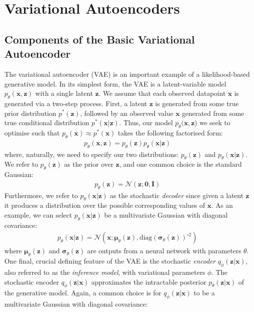 \documentclass[ oneside,%
                    author={George Herbert},
                    degree={MSci},
                     title={Diffusion Models for Time-Evolving Precipitation Fields},
                  subtitle={}]{dissertation}
\begin{document}
\section{Variational Autoencoders}
\label{sec:background_vae}

\subsection{Components of the Basic Variational Autoencoder}
\label{sec:background_vae_latent}

The variational autoencoder (VAE) \cite{Autoencoding_Variational_Bayes_Kingma,Stochastic_Backpropagation_Rezende} is an important example of a likelihood-based generative model. In its simplest form, the VAE is a latent-variable model $p_\theta(\mathbf{x},\mathbf{z})$ with a single latent $\mathbf{z}$. We assume that each observed datapoint $\mathbf{x}$ is generated via a two-step process. First, a latent $\mathbf{z}$ is generated from some true prior distribution $p^*(\mathbf{z})$, followed by an observed value $\mathbf{x}$ generated from some true conditional distribution $p^*(\mathbf{x}|\mathbf{z})$. Thus, our model $p_\theta(\mathbf{x},\mathbf{z}$) we seek to optimise such that $p_\theta(\mathbf{x})\approx p^*(\mathbf{x})$ takes the following factorised form:
\begin{align}
      p_\theta(\mathbf{x},\mathbf{z})=p_\theta(\mathbf{z})p_\theta(\mathbf{x}|\mathbf{z})
\end{align}
where, naturally, we need to specify our two distributions: $p_\theta(\mathbf{z})$ and $p_\theta(\mathbf{x}|\mathbf{z})$. We refer to $p_\theta(\mathbf{z})$ as the prior over $\mathbf{z}$, and one common choice is the standard Gaussian:
\begin{align}
      p_\theta(\mathbf{z})=\mathcal{N}(\mathbf{z};\mathbf{0}, \mathbf{I})
\end{align}
Furthermore, we refer to $p_\theta(\mathbf{x}|\mathbf{z})$ as the stochastic \textit{decoder} since given a latent $\mathbf{z}$ it produces a distribution over the possible corresponding values of $\mathbf{x}$. As an example, we can select $p_\theta(\mathbf{x}|\mathbf{z})$ be a multivariate Gaussian with diagonal covariance:
\begin{align}
      p_\theta(\mathbf{x}|\mathbf{z})=\mathcal{N}(\mathbf{x}; \boldsymbol{\mu}_\theta (\mathbf{z}), \mathrm{diag}(\boldsymbol\sigma_\theta(\mathbf{z}))^{\circ 2})
\end{align}
where $\boldsymbol{\mu}_\theta(\mathbf{z})$ and $\boldsymbol\sigma_\theta(\mathbf{z})$ are outputs from a neural network with parameters $\theta$. One final, crucial defining feature of the VAE is the stochastic \textit{encoder} $q_\phi(\mathbf{z}|\mathbf{x})$, also referred to as the \textit{inference model}, with variational parameters $\phi$. The stochastic encoder $q_\phi(\mathbf{z}|\mathbf{x})$ approximates the intractable posterior $p_\theta(\mathbf{z}|\mathbf{x})$ of the generative model. Again, a common choice is for $q_\phi(\mathbf{z}|\mathbf{x})$ to be a multivariate Gaussian with diagonal covariance:
\end{document}
